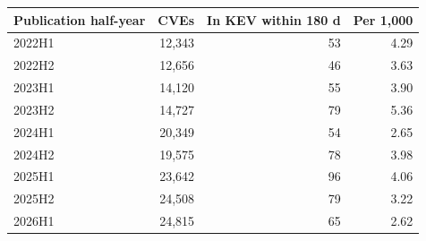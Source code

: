 \begin{tabular}{lrrr}
\toprule
Publication half-year & CVEs & In KEV within 180 d & Per 1,000 \\
\midrule
2022H1 & 12,343 & 53 & 4.29 \\
2022H2 & 12,656 & 46 & 3.63 \\
2023H1 & 14,120 & 55 & 3.90 \\
2023H2 & 14,727 & 79 & 5.36 \\
2024H1 & 20,349 & 54 & 2.65 \\
2024H2 & 19,575 & 78 & 3.98 \\
2025H1 & 23,642 & 96 & 4.06 \\
2025H2 & 24,508 & 79 & 3.22 \\
2026H1 & 24,815 & 65 & 2.62 \\
\bottomrule
\end{tabular}
